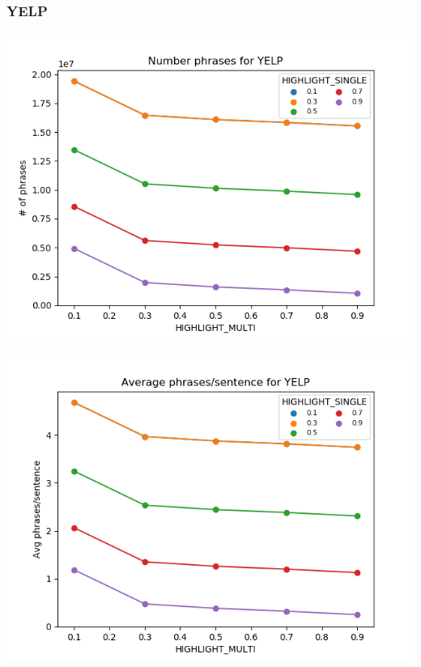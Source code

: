 \documentclass[11pt]{article}
\begin{document}
\subsubsection*{YELP}
\begin{multicols}{2}
\includegraphics[scale=0.3]{n_phrases_yelp.png}

\includegraphics[scale=0.3]{avg_phrases_yelp.png}
\end{multicols}
\end{document}
